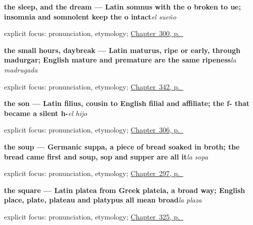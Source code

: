 \noindent\begin{minipage}[t]{\linewidth}
\raggedright
\textbf{the sleep, and the dream — Latin somnus with the o broken to ue; insomnia and somnolent keep the o intact}\enspace\emph{el sueño}\par
\footnotesize explicit focus: pronunciation, etymology; \hyperref[ch:el-cuerpo-dice]{Chapter~300, p.~\pageref*{ch:el-cuerpo-dice}}
\end{minipage}\par\smallskip

\noindent\begin{minipage}[t]{\linewidth}
\raggedright
\textbf{the small hours, daybreak — Latin maturus, ripe or early, through madurgar; English mature and premature are the same ripeness}\enspace\emph{la madrugada}\par
\footnotesize explicit focus: pronunciation, etymology; \hyperref[ch:el-minuto-y-el-cuarto]{Chapter~342, p.~\pageref*{ch:el-minuto-y-el-cuarto}}
\end{minipage}\par\smallskip

\noindent\begin{minipage}[t]{\linewidth}
\raggedright
\textbf{the son --- Latin filius, cousin to English filial and affiliate; the f- that became a silent h-}\enspace\emph{el hijo}\par
\footnotesize explicit focus: pronunciation, etymology; \hyperref[ch:hijos-y-abuelos]{Chapter~306, p.~\pageref*{ch:hijos-y-abuelos}}
\end{minipage}\par\smallskip

\noindent\begin{minipage}[t]{\linewidth}
\raggedright
\textbf{the soup — Germanic suppa, a piece of bread soaked in broth; the bread came first and soup, sop and supper are all it}\enspace\emph{la sopa}\par
\footnotesize explicit focus: pronunciation, etymology; \hyperref[ch:la-cocina]{Chapter~297, p.~\pageref*{ch:la-cocina}}
\end{minipage}\par\smallskip

\noindent\begin{minipage}[t]{\linewidth}
\raggedright
\textbf{the square — Latin platea from Greek plateia, a broad way; English place, plate, plateau and platypus all mean broad}\enspace\emph{la plaza}\par
\footnotesize explicit focus: pronunciation, etymology; \hyperref[ch:pais-y-lugar]{Chapter~325, p.~\pageref*{ch:pais-y-lugar}}
\end{minipage}\par\smallskip

